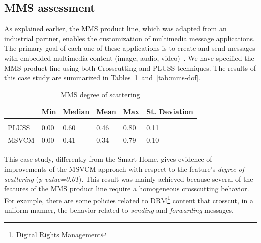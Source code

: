 


\subsection{MMS assessment}

As explained earlier, the MMS product line, which was adapted from an industrial
partner, enables the customization of multimedia message applications. The
primary goal of each one of these applications is to create and send messages
with embedded multimedia content (image, audio, video)~\cite{Bonifacio:2008aa}.
We have specified the MMS product line using both Crosscutting and PLUSS
techniques. The results of this case study are
summarized in Tables~\ref{tab:mms-dos}~and~\ref{tab:mms-dof}.

\begin{table}[htb] \centering
\caption{MMS degree of scattering}
\label{tab:mms-dos}
\begin{small}
\begin{tabular}{llllll} \hline
					& Min 	& Median 	& Mean 	& Max 	& St. Deviation \\ \hline \\
	PLUSS			& 0.00  & 0.60   	& 0.46  & 0.80 	& 0.11 			\\
	MSVCM			& 0.00  & 0.41   	& 0.34 	& 0.79 	& 0.10			\\ \hline	
\end{tabular}
\end{small}
\end{table}

This case study, differently from the Smart Home, gives evidence of improvements of the
MSVCM approach with respect to the feature's \emph{degree of scattering}
(\emph{p-value=0.01}). This result was mainly achieved because several of the features of
the MMS product line require a homogeneous crosscutting behavior. For example,
there are some policies related to DRM\footnote{Digital Rights Management}
content that crosscut, in a uniform manner, the behavior related to
\emph{sending} and \emph{forwarding} messages.

